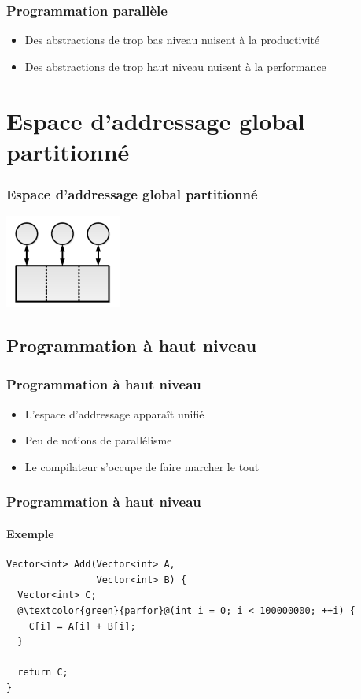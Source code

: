\documentclass{beamer}
\begin{document}
\begin{frame}
\frametitle{Programmation parallèle}
\begin{itemize}
\item Des abstractions de trop bas niveau nuisent à la productivité
\item Des abstractions de trop haut niveau nuisent à la performance
\end{itemize}
\end{frame}

\section{Espace d'addressage global partitionné}
\begin{frame}
\frametitle{Espace d'addressage global partitionné}
\begin{center}
\includegraphics[scale=3]{pgas.png}
\end{center}
\end{frame}

\subsection{Programmation à haut niveau}
\begin{frame}
\frametitle{Programmation à haut niveau}
\begin{itemize}
\item L'espace d'addressage apparaît unifié
\item Peu de notions de parallélisme
\item Le compilateur s'occupe de faire marcher le tout
\end{itemize}
\end{frame}

\begin{frame}[fragile]
\frametitle{Programmation à haut niveau}
\framesubtitle{Exemple}
\begin{lstlisting}
Vector<int> Add(Vector<int> A, 
                Vector<int> B) {
  Vector<int> C;
  @\textcolor{green}{parfor}@(int i = 0; i < 100000000; ++i) {
    C[i] = A[i] + B[i];  
  }
  
  return C;
}
\end{lstlisting}
\end{frame}
\end{document}
